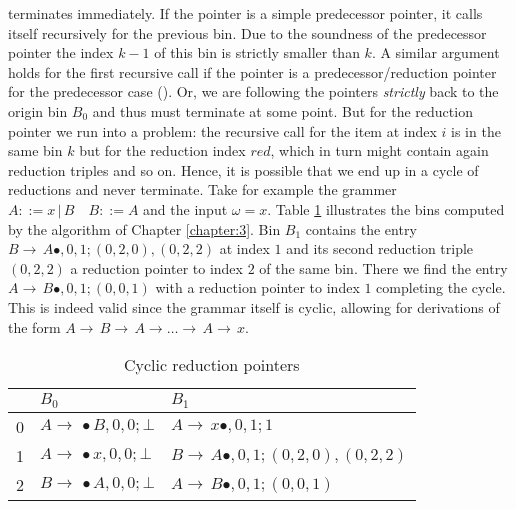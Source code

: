 \begin{isabellebody}
\begin{isamarkuptext}
terminates immediately. If the pointer is a simple predecessor pointer, it calls itself recursively
for the previous bin. Due to the soundness of the predecessor pointer the index $k-1$ of this bin
is strictly smaller than $k$. A similar argument holds for the first recursive call if the pointer
is a predecessor/reduction pointer for the predecessor case (). Or, we are following
the pointers \textit{strictly} back to the origin bin $B_0$ and thus must terminate at some point. But for
the reduction pointer we run into a problem: the recursive call for the item at index $i$ is in the same
bin $k$ but for the reduction index $red$, which in turn might contain again reduction triples and so on.
Hence, it is possible that we end up in a cycle of reductions and never terminate. Take for example the
grammer $A ::= x \, | \, B \quad B ::= A$ and the input $\omega = x$. Table \ref{tab:cyclic-pointers}
illustrates the bins computed by the algorithm of Chapter \ref{chapter:3}. Bin $B_1$ contains the entry
$B \rightarrow \, A \bullet, 0, 1; (0, 2, 0),(0, 2, 2)$ at index $1$ and its second reduction triple
$(0, 2, 2)$ a reduction pointer to index $2$ of the same bin. There we find the entry
$A \rightarrow \, B \bullet, 0, 1; (0, 0, 1)$ with a reduction pointer to index $1$ completing the
cycle. This is indeed valid since the grammar itself is cyclic, allowing for derivations of the form
$A \rightarrow \, B \rightarrow \, A \rightarrow \dots \rightarrow \, A \rightarrow \, x$.

  \begin{table}[htpb]
    \caption[Cyclic reduction pointers]{Cyclic reduction pointers} \label{tab:cyclic-pointers}
    \centering
    \begin{tabular}{| l | l | l |}
          & $B_0$                                     & $B_1$ \\
      \midrule
        0 & $A \rightarrow \, \bullet B, 0, 0; \bot$  & $A \rightarrow \, x \bullet, 0, 1; 1$ \\
        1 & $A \rightarrow \, \bullet x, 0, 0; \bot$  & $B \rightarrow \, A \bullet, 0, 1; (0, 2, 0),(0, 2, 2)$ \\
        2 & $B \rightarrow \, \bullet A, 0, 0; \bot$  & $A \rightarrow \, B \bullet, 0, 1; (0, 0, 1)$ \\
    \end{tabular}
  \end{table}


\end{isamarkuptext}
\end{isabellebody}
